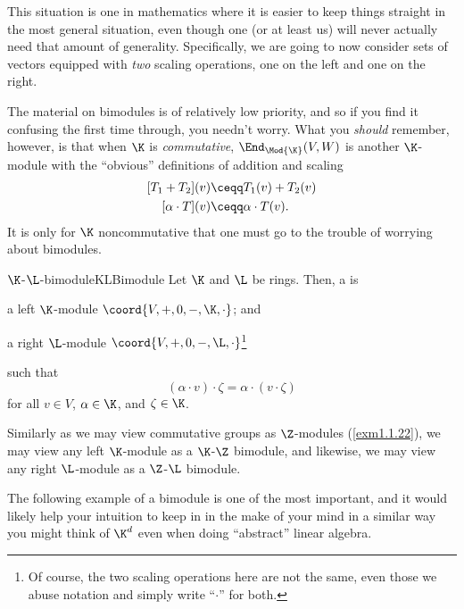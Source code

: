 This situation is one in mathematics where it is easier to keep things straight in the most general situation, even though one (or at least us) will never actually need that amount of generality.  Specifically, we are going to now consider sets of vectors equipped with \emph{two} scaling operations, one on the left and one on the right.
\begin{rmk}
	The material on bimodules is of relatively low priority, and so if you find it confusing the first time through, you needn't worry.  What you \emph{should} remember, however, is that when $\K$ is \emph{commutative}, $\End _{\Mod{\K}}(V,W)$ is another $\K$-module with the ``obvious'' definitions of addition and scaling
	\begin{subequations}
		\begin{align}
			[T_1+T_2](v) & \ceqq T_1(v)+T_2(v) \\
			[\alpha \cdot T](v) & \ceqq \alpha \cdot T(v).
		\end{align}
	\end{subequations}
	It is only for $\K$ noncommutative that one must go to the trouble of worrying about bimodules.
\end{rmk}
\begin{dfn}{$\K$-$\L$-bimodule}{KLBimodule}
	Let $\K$ and $\L$ be rings.  Then, a  is
	\begin{data}
		\item a left $\K$-module $\coord{V,+,0,-,\K ,\cdot}$; and
		\item a right $\L$-module $\coord{V,+,0,-,\L ,\cdot}$\footnote{Of course, the two scaling operations here are not the same, even those we abuse notation and simply write ``$\cdot$'' for both.}
	\end{data}
	such that
	\begin{equation}
		(\alpha \cdot v)\cdot \zeta =\alpha \cdot (v\cdot \zeta )
	\end{equation}
	for all $v\in V$, $\alpha \in \K$, and $\zeta \in \K$.
	\begin{rmk}
		Similarly as we may view commutative groups as $\Z$-modules (\cref{exm1.1.22}), we may view any left $\K$-module as a $\K$-$\Z$ bimodule, and likewise, we may view any right $\L$-module as a $\Z$-$\L$ bimodule.
	\end{rmk}
\end{dfn}
The following example of a bimodule is one of the most important, and it would likely help your intuition to keep in in the make of your mind in a similar way you might think of $\K ^d$ even when doing ``abstract'' linear algebra.
